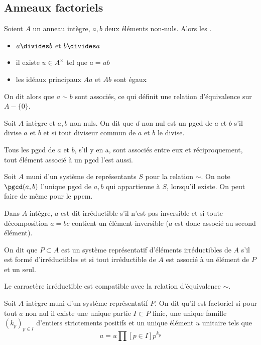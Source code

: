 \documentclass[a4paper,11pt,twocolumn]{article}\usepackage[landscape]{geometry}
\begin{document}

  \subsection{Anneaux factoriels}

     Soient $A$ un anneau intègre, $a,b$ deux éléments non-nuls. Alors les \Asse{}.
    \begin{itemize}
      \item $a\divides b$ et $b\divides a$
      \item il existe $u\in A^\times$ tel que $a=ub$
      \item les idéaux principaux $Aa$ et $Ab$ sont égaux
    \end{itemize}

    On dit alors que $a\sim b$ sont associés, ce qui définit une relation d'équivalence sur $A-\{0\}$.

     Soit $A$ intègre et $a,b$ non nuls. On dit que $d$ non nul est un pgcd de $a$ et $b$ s'il divise $a$ et $b$ et si tout diviseur commun de $a$ et $b$ le divise.

     Tous les pgcd de $a$ et $b$, s'il y en a, sont associés entre eux et réciproquement, tout élément associé à un pgcd l'est aussi.

     Soit $A$ muni d'un système de représentants $S$ pour la relation $\sim$. On note $\pgcd(a,b)$ l'unique pgcd de $a,b$ qui appartienne à $S$, lorsqu'il existe. On peut faire de même pour le ppcm.

     Dans $A$ intègre, $a$ est dit irréductible s'il n'est pas inversible et si toute décomposition $a=bc$ contient un élément inversible ($a$ est donc associé au second élément).

     On dit que $P\subset A$ est un système représentatif d'éléments irréductibles de $A$ s'il est formé d'irréductibles et si tout irréductible de $A$ est associé à un élément de $P$ et un seul.

     Le carractère irréductible est compatible avec la relation d'équivalence $\sim$.

     Soit $A$ intègre muni d'un système représentatif $P$. On dit qu'il est factoriel si pour tout $a$ non nul il existe une unique partie $I\subset P$ finie, une unique famille $(k_p)_{p\in I}$ d'entiers strictements positifs et un unique élément $u$ unitaire tels que
    \[a = u\prod[p\in I]{p^{k_p}}\]
\end{document}
